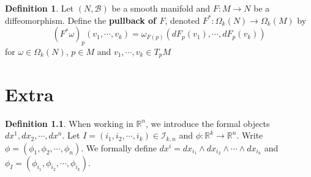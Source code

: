 \documentclass{book}
\theoremstyle{definition}
\newtheorem{defn}[definition]{Definition}
\newcommand{\om}{\omega}
\newcommand{\Om}{\Omega}
\newcommand{\R}{\mathbb{R}}
\newcommand{\MB}{\mathcal{B}}
\newcommand{\MI}{\mathcal{I}}
\DeclareMathOperator*{\0}{\mbf{0}}
\DeclareMathOperator*{\1}{\mbf{1}}
\begin{document}
	
	\begin{defn}
		Let $(N, \MB)$ be a smooth manifold and $F: M \rightarrow N$ be a diffeomorphism. Define the \textbf{pullback of $F$}, denoted $F^*: \Om_k(N) \rightarrow \Om_k(M)$ by  $$(F^* \om)_p (v_1, \cdots, v_k) = \om_{F(p)} (dF_p(v_1), \cdots, dF_p(v_k))$$ for $\om \in \Om_k(N)$, $p \in M$ and $v_1, \cdots, v_k \in T_{p}M$
	\end{defn}










	
	
	
	
	
	
	
	
	
	
	
	
	
	
	
	
	
	
	
	
	\newpage 
	\chapter{Extra}
	\begin{defn}
		When working in $\R^n$, we introduce the formal objects $dx^1, dx_2, \cdots, dx^n$. Let $I = (i_1, i_2, \cdots, i_k)\in \MI_{k,n}$ and $\phi: \R^k \rightarrow \R^n$. Write $\phi = (\phi_1, \phi_2, \cdots, \phi_n)$. We formally define $dx^i = dx_{i_1}\wedge dx_{i_2} \wedge \cdots \wedge dx_{i_k}$ and $\phi_I = (\phi_{i_1}, \phi_{i_2}, \cdots, \phi_{i_k})$.   
	\end{defn}
	
\end{document}
